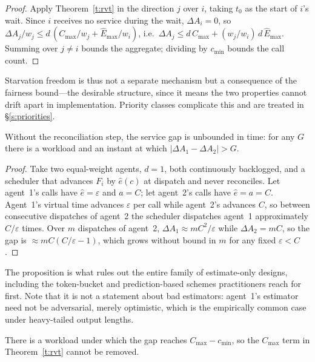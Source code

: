 \documentclass[letterpaper,11pt,leqno]{article}
\begin{document}
\begin{proof}
Apply Theorem~\ref{t:rvt} in the direction $j$ over $i$, taking $t_0$ as the start of $i$'s wait. Since $i$ receives no service during the wait, $\Delta A_i = 0$, so $\Delta A_j / w_j \le d\,(C_{\max}/w_j + \hat{E}_{\max}/w_i)$, i.e.\ $\Delta A_j \le d\,C_{\max} + (w_j/w_i)\,d\,\hat{E}_{\max}$. Summing over $j \ne i$ bounds the aggregate; dividing by $c_{\min}$ bounds the call count.
\end{proof}

Starvation freedom is thus not a separate mechanism but a consequence of the fairness bound---the desirable structure, since it means the two properties cannot drift apart in implementation. Priority classes complicate this and are treated in \S\ref{s:priorities}.

\begin{proposition}\label{p:norecon}
Without the reconciliation step, the service gap is unbounded in time: for any $G$ there is a workload and an instant at which $|\Delta A_1 - \Delta A_2| > G$.
\end{proposition}

\begin{proof}
Take two equal-weight agents, $d = 1$, both continuously backlogged, and a scheduler that advances $F_i$ by $\hat{e}(c)$ at dispatch and never reconciles. Let agent~1's calls have $\hat{e} = \varepsilon$ and $a = C$; let agent~2's calls have $\hat{e} = a = C$. Agent~1's virtual time advances $\varepsilon$ per call while agent~2's advances $C$, so between consecutive dispatches of agent~2 the scheduler dispatches agent~1 approximately $C/\varepsilon$ times. Over $m$ dispatches of agent~2, $\Delta A_1 \approx m C^2/\varepsilon$ while $\Delta A_2 = mC$, so the gap is $\approx mC(C/\varepsilon - 1)$, which grows without bound in $m$ for any fixed $\varepsilon < C$.
\end{proof}

The proposition is what rules out the entire family of estimate-only designs, including the token-bucket and prediction-based schemes practitioners reach for first. Note that it is not a statement about bad estimators: agent~1's estimator need not be adversarial, merely optimistic, which is the empirically common case under heavy-tailed output lengths.

\begin{proposition}\label{p:tightness}
There is a workload under which the gap reaches $C_{\max} - c_{\min}$, so the $C_{\max}$ term in Theorem~\ref{t:rvt} cannot be removed.
\end{proposition}
\end{document}
